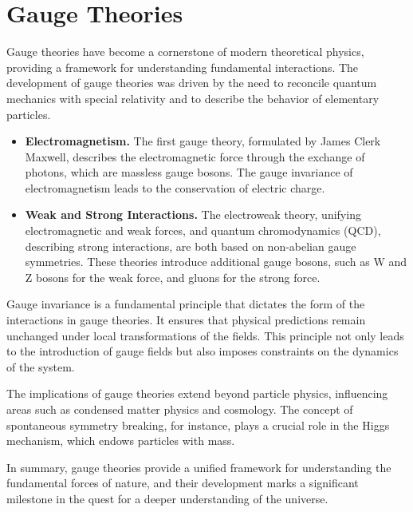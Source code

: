 \documentclass[../QFT_main.tex]{subfiles}
\begin{document}
\chapter{Gauge Theories}


\begin{mytheorem}
Gauge theories have become a cornerstone of modern theoretical physics, providing a framework for understanding fundamental interactions. The development of gauge theories was driven by the need to reconcile quantum mechanics with special relativity and to describe the behavior of elementary particles.

\begin{itemize}
    \item \textbf{Electromagnetism.} The first gauge theory, formulated by James Clerk Maxwell, describes the electromagnetic force through the exchange of photons, which are massless gauge bosons. The gauge invariance of electromagnetism leads to the conservation of electric charge.
    
    \item \textbf{Weak and Strong Interactions.} The electroweak theory, unifying electromagnetic and weak forces, and quantum chromodynamics (QCD), describing strong interactions, are both based on non-abelian gauge symmetries. These theories introduce additional gauge bosons, such as W and Z bosons for the weak force, and gluons for the strong force.
\end{itemize}
\end{mytheorem}

\begin{mytheorem}
Gauge invariance is a fundamental principle that dictates the form of the interactions in gauge theories. It ensures that physical predictions remain unchanged under local transformations of the fields. This principle not only leads to the introduction of gauge fields but also imposes constraints on the dynamics of the system.

The implications of gauge theories extend beyond particle physics, influencing areas such as condensed matter physics and cosmology. The concept of spontaneous symmetry breaking, for instance, plays a crucial role in the Higgs mechanism, which endows particles with mass.

In summary, gauge theories provide a unified framework for understanding the fundamental forces of nature, and their development marks a significant milestone in the quest for a deeper understanding of the universe.
\end{mytheorem}
\end{document}
